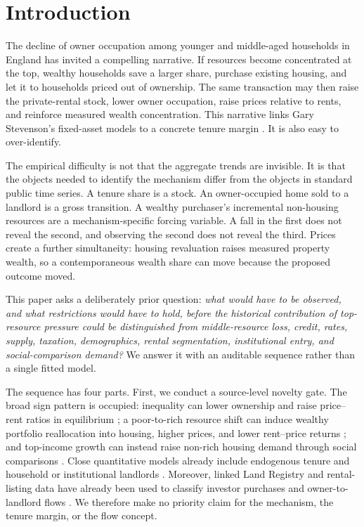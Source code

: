 \documentclass[11pt]{article}
\begin{document}
\section{Introduction}

The decline of owner occupation among younger and middle-aged households in
England has invited a compelling narrative. If resources become concentrated at
the top, wealthy households save a larger share, purchase existing housing, and
let it to households priced out of ownership. The same transaction may then
raise the private-rental stock, lower owner occupation, raise prices relative to
rents, and reinforce measured wealth concentration. This narrative links Gary
Stevenson's fixed-asset models to a concrete tenure margin
\citep[esp. pp.~61--62]{stevenson2019}. It is also easy to over-identify.

The empirical difficulty is not that the aggregate trends are invisible. It is
that the objects needed to identify the mechanism differ from the objects in
standard public time series. A tenure share is a stock. An owner-occupied home
sold to a landlord is a gross transition. A wealthy purchaser's incremental
non-housing resources are a mechanism-specific forcing variable. A fall in the
first does not reveal the second, and observing the second does not reveal the
third. Prices create a further simultaneity: housing revaluation raises measured
property wealth, so a contemporaneous wealth share can move because the proposed
outcome moved.

This paper asks a deliberately prior question: \emph{what would have to be
observed, and what restrictions would have to hold, before the historical
contribution of top-resource pressure could be distinguished from middle-resource
loss, credit, rates, supply, taxation, demographics, rental segmentation,
institutional entry, and social-comparison demand?} We answer it with an
auditable sequence rather than a single fitted model.

The sequence has four parts. First, we conduct a source-level novelty gate. The
broad sign pattern is occupied: inequality can lower ownership and raise
price--rent ratios in equilibrium \citep{head2023}; a poor-to-rich resource shift
can induce wealthy portfolio reallocation into housing, higher prices, and lower
rent--price returns \citep{zhang2015}; and top-income growth can instead raise
non-rich housing demand through social comparisons \citep{drechselgrau2026}.
Close quantitative models already include endogenous tenure and household or
institutional landlords \citep{moktan2025,albuquerque2025,cima2026,castellanos2024}.
Moreover, linked Land Registry and rental-listing data have already been used to
classify investor purchases and owner-to-landlord flows
\citep{bracke2021,bankofengland2023flows}. We therefore make no priority claim
for the mechanism, the tenure margin, or the flow concept.
\end{document}
